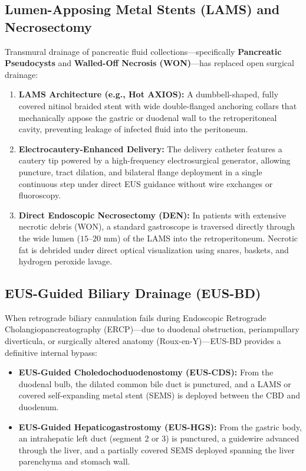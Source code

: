 \documentclass[11pt,a4paper]{article}
\begin{document}
\subsection{Lumen-Apposing Metal Stents (LAMS) and Necrosectomy}
Transmural drainage of pancreatic fluid collections—specifically \textbf{Pancreatic Pseudocysts} and \textbf{Walled-Off Necrosis (WON)}—has replaced open surgical drainage:
\begin{enumerate}[leftmargin=2em]
    \item \textbf{LAMS Architecture (e.g., Hot AXIOS):} A dumbbell-shaped, fully covered nitinol braided stent with wide double-flanged anchoring collars that mechanically appose the gastric or duodenal wall to the retroperitoneal cavity, preventing leakage of infected fluid into the peritoneum.
    \item \textbf{Electrocautery-Enhanced Delivery:} The delivery catheter features a cautery tip powered by a high-frequency electrosurgical generator, allowing puncture, tract dilation, and bilateral flange deployment in a single continuous step under direct EUS guidance without wire exchanges or fluoroscopy.
    \item \textbf{Direct Endoscopic Necrosectomy (DEN):} In patients with extensive necrotic debris (WON), a standard gastroscope is traversed directly through the wide lumen ($15\text{--}20\text{ mm}$) of the LAMS into the retroperitoneum. Necrotic fat is debrided under direct optical visualization using snares, baskets, and hydrogen peroxide lavage.
\end{enumerate}

\subsection{EUS-Guided Biliary Drainage (EUS-BD)}
When retrograde biliary cannulation fails during Endoscopic Retrograde Cholangiopancreatography (ERCP)—due to duodenal obstruction, periampullary diverticula, or surgically altered anatomy (Roux-en-Y)—EUS-BD provides a definitive internal bypass:
\begin{itemize}[leftmargin=2em]
    \item \textbf{EUS-Guided Choledochoduodenostomy (EUS-CDS):} From the duodenal bulb, the dilated common bile duct is punctured, and a LAMS or covered self-expanding metal stent (SEMS) is deployed between the CBD and duodenum.
    \item \textbf{EUS-Guided Hepaticogastrostomy (EUS-HGS):} From the gastric body, an intrahepatic left duct (segment 2 or 3) is punctured, a guidewire advanced through the liver, and a partially covered SEMS deployed spanning the liver parenchyma and stomach wall.
\end{itemize}
\end{document}
